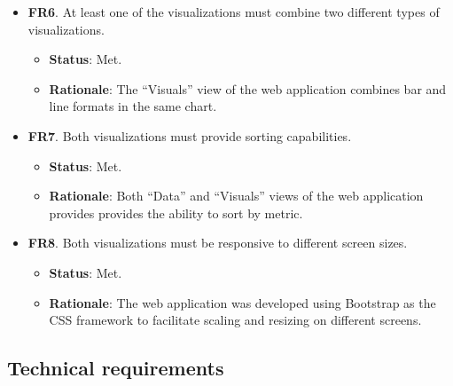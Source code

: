 \begin{itemize}
\begin{itemize}
	\end{itemize}
	\item \textbf{FR6}. At least one of the visualizations must combine two different types of visualizations.
	\begin{itemize}
		\item \textbf{Status}: Met.
		\item \textbf{Rationale}: The ``Visuals'' view of the web application combines bar and line formats in the same chart.
	\end{itemize}
	\item \textbf{FR7}. Both visualizations must provide sorting capabilities.
	\begin{itemize}
		\item \textbf{Status}: Met.
		\item \textbf{Rationale}: Both ``Data'' and ``Visuals'' views of the web application provides provides the ability to sort by metric.
	\end{itemize}
	\item \textbf{FR8}. Both visualizations must be responsive to different screen sizes.
	\begin{itemize}
		\item \textbf{Status}: Met.
		\item \textbf{Rationale}: The web application was developed using Bootstrap as the CSS framework to facilitate scaling and resizing on different screens.
	\end{itemize}
\end{itemize}

\subsection{Technical requirements}

